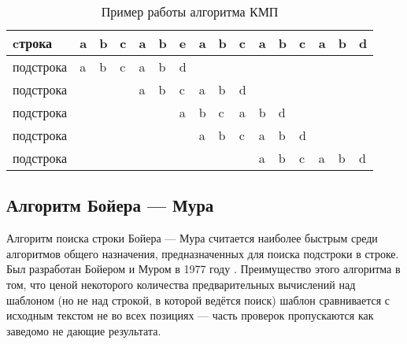 \documentclass[a4paper,14pt]{extreport}
\begin{document}
\begin{table}[!h]
	\begin{center}
		\begin{tabular}{|l|l|l|l|l|l|l|l|l|l|l|l|l|l|l|l|}
			\hline
			cтрока    & a & b & c & a & b & e                         & a & b & c & a                         & b                         & c                         & a                         & b                         & d                         \\ \hline
			подстрока & a & b & c & a & b & \cellcolor[HTML]{FE0000}d &   &   &   &                           &                           &                           &                           &                           &                           \\ \hline
			подстрока &   &   &   & a & b & \cellcolor[HTML]{FE0000}c & a & b & d &                           &                           &                           &                           &                           &                           \\ \hline
			подстрока &   &   &   &   &   & \cellcolor[HTML]{FE0000}a & b & c & a & b                         & d                         &                           &                           &                           &                           \\ \hline
			подстрока &   &   &   &   &   &                           & a & b & c & a                         & b                         & \cellcolor[HTML]{FE0000}d &                           &                           &                           \\ \hline
			подстрока &   &   &   &   &   &                           &   &   &   & \cellcolor[HTML]{34FF34}a & \cellcolor[HTML]{34FF34}b & \cellcolor[HTML]{34FF34}c & \cellcolor[HTML]{34FF34}a & \cellcolor[HTML]{34FF34}b & \cellcolor[HTML]{34FF34}d \\ \hline
		\end{tabular}
		\caption{Пример работы алгоритма КМП}
		\label{tbl:kmp-example-analysis}
	\end{center}
\end{table}

\subsection{Алгоритм Бойера — Мура}

Алгоритм поиска строки Бойера — Мура считается наиболее быстрым среди алгоритмов общего назначения, предназначенных для поиска подстроки в строке.
Был разработан Бойером и Муром в 1977 году \cite{Boyer}.
Преимущество этого алгоритма в том, что ценой некоторого количества предварительных вычислений над шаблоном (но не над строкой, в которой ведётся поиск) шаблон сравнивается с исходным текстом не во всех позициях — часть проверок пропускаются как заведомо не дающие результата.
\end{document}
